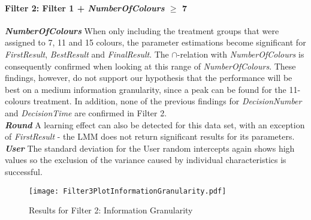 \paragraph{Filter 2: Filter 1 + \textit{NumberOfColours} $\geq$ 7}
\textbf{\textit{NumberOfColours} } When only including the treatment groups that were assigned to 7, 11 and 15 colours, the parameter estimations become significant for \textit{FirstResult}, \textit{BestResult} and \textit{FinalResult}. The \textbf{$\cap$}-relation with \textit{NumberOfColours} is consequently confirmed when looking at this range of \textit{NumberOfColours}. These findings, however, do not support our hypothesis that the performance will be best on a medium information granularity, since a peak can be found for the 11-colours treatment. In addition, none of the previous findings for \textit{DecisionNumber} and \textit{DecisionTime} are confirmed in Filter 2.\\
\textbf{\textit{Round} } A learning effect can also be detected for this data set, with an exception of \textit{FirstResult} - the \ac{LMM} does not return significant results for its parameters. \\
\textbf{\textit{User} } The standard deviation for the User random intercepts again shows high values so the exclusion of the variance caused by individual characteristics is successful.\\

\begin{figure}[H] %
\begin{center}
\texttt{[image: Filter3PlotInformationGranularity.pdf]}    
  \caption[Results for Filter 2: Information Granularity]{Results for Filter 2: Information Granularity\footnotemark}
    \label{fig:Results for Filter 3: Information Granularity} 
\end{center}
\end{figure}

